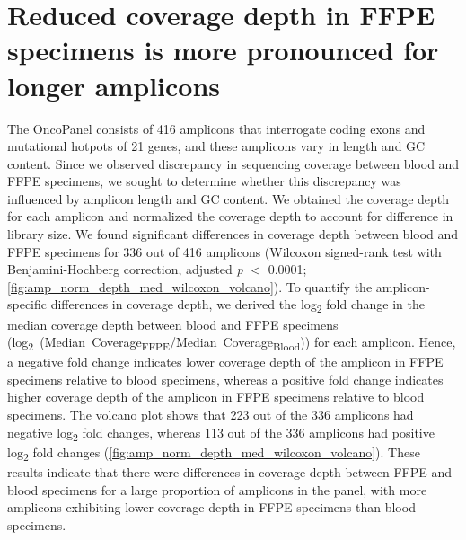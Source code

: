\newpage
\section{Reduced coverage depth in FFPE specimens is more pronounced for longer amplicons}
\label{sec:ReducedcoveragedepthinFFPEspecimensismorepronouncedforlongeramplicons}

The OncoPanel consists of 416 amplicons that interrogate coding exons and mutational hotpots of 21 genes, and these amplicons vary in length and GC content. Since we observed discrepancy in sequencing coverage between blood and FFPE specimens, we sought to determine whether this discrepancy was influenced by amplicon length and GC content. We obtained the coverage depth for each amplicon and normalized the coverage depth to account for difference in library size. We found significant differences in coverage depth between blood and FFPE specimens for 336 out of 416 amplicons (Wilcoxon signed-rank test with Benjamini-Hochberg correction, adjusted \textit{p} $<$ 0.0001; \autoref{fig:amp_norm_depth_med_wilcoxon_volcano}). To quantify the amplicon-specific differences in coverage depth, we derived the log\textsubscript{2} fold change in the median coverage depth between blood and FFPE specimens \mbox{(log\textsubscript{2} (Median Coverage\textsubscript{FFPE}/Median Coverage\textsubscript{Blood}))} for each amplicon. Hence, a negative fold change indicates lower coverage depth of the amplicon in FFPE specimens relative to blood specimens, whereas a positive fold change indicates higher coverage depth of the amplicon in FFPE specimens relative to blood specimens. The volcano plot shows that 223 out of the 336 amplicons had negative log\textsubscript{2} fold changes, whereas 113 out of the 336 amplicons had positive log\textsubscript{2} fold changes (\autoref{fig:amp_norm_depth_med_wilcoxon_volcano}). These results indicate that there were differences in coverage depth between FFPE and blood specimens for a large proportion of amplicons in the panel, with more amplicons exhibiting lower coverage depth in FFPE specimens than blood specimens.

